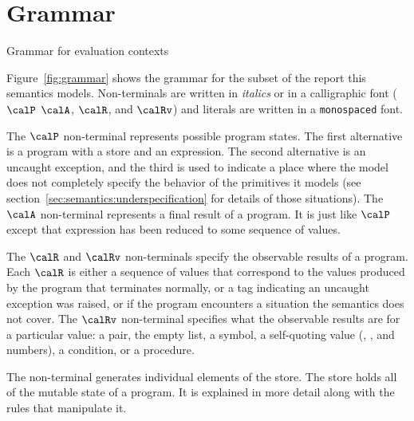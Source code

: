 \section{Grammar}\label{sec:semantics:grammar}

\beginfig
\subfigureadjust{}

\caption{Grammar for evaluation contexts}\label{fig:ec-grammar}
\endfig
\subfigurestop{}

Figure~\ref{fig:grammar} shows the grammar for the subset of the
report this semantics models. Non-terminals are written in
\textit{italics} or in a calligraphic font ($\calP$
$\calA$, $\calR$, and $\calRv$) and literals are 
written in a \texttt{monospaced} font.

The $\calP$ non-terminal represents possible program states. The
first alternative is a program with a store and an expression. 
The second alternative is an uncaught exception, and the third is
used to indicate a place where the model does not completely specify
the behavior of the primitives it models (see section~\ref{sec:semantics:underspecification} for details of those situations). 
The $\calA$ non-terminal
represents a final result of a program. It is just like $\calP$
except that expression has been reduced to some sequence of values.

The $\calR$ and $\calRv$ non-terminals specify the observable results of a program. Each $\calR$ is either a sequence of values that correspond to the values produced by the program that terminates normally, or a tag indicating an uncaught exception was raised, or  if the program encounters a situation the semantics does not cover. The $\calRv$ non-terminal specifies what the observable results are for a particular value: a pair, the empty list, a symbol, a self-quoting value (\schtrue, \schfalse, and numbers), a condition, or a procedure.

The  non-terminal generates individual elements of the
store. The store holds all of the mutable state of a program. It is
explained in more detail along with the rules that manipulate it.

